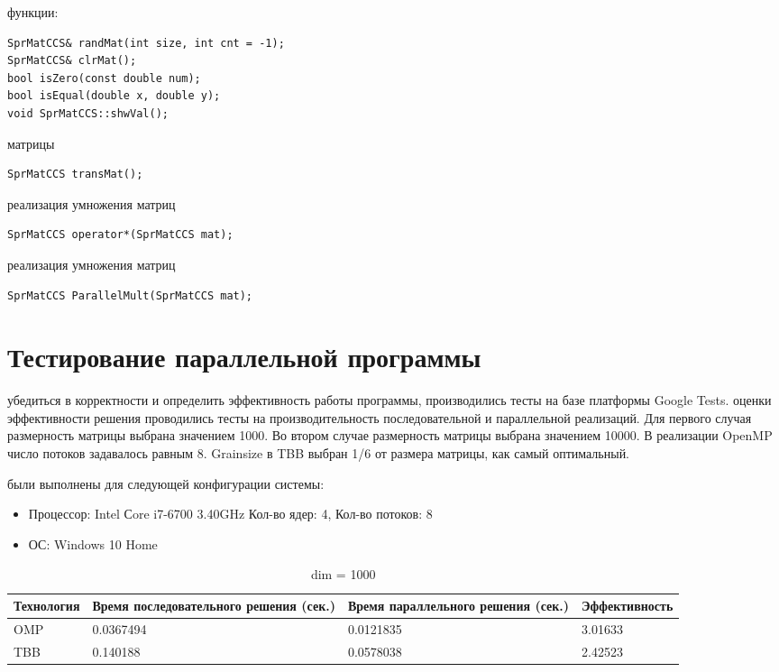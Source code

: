 \documentclass{report}
\begin{document}
 функции:
\begin{lstlisting}
SprMatCCS& randMat(int size, int cnt = -1);
SprMatCCS& clrMat();
bool isZero(const double num);
bool isEqual(double x, double y);
void SprMatCCS::shwVal();
\end{lstlisting}

 матрицы
\begin{lstlisting}
SprMatCCS transMat();
\end{lstlisting}
 реализация умножения матриц
\begin{lstlisting}
SprMatCCS operator*(SprMatCCS mat);
\end{lstlisting}
 реализация умножения матриц
\begin{lstlisting}
SprMatCCS ParallelMult(SprMatCCS mat);
\end{lstlisting}
\newpage

\section*{Тестирование параллельной программы}
 убедиться в корректности и определить эффективность работы программы, производились тесты на базе платформы Google Tests.
 оценки эффективности решения проводились тесты на производительность последовательной и параллельной реализаций. Для первого случая размерность матрицы выбрана значением 1000. Во втором случае размерность матрицы выбрана значением 10000. В реализации OpenMP число потоков задавалось равным 8. Grainsize в TBB выбран 1/6 от размера матрицы, как самый оптимальный.

 были выполнены для следующей конфигурации системы:
\begin{itemize}
    \item Процессор: Intel Сore i7-6700 3.40GHz Кол-во ядер: 4, Кол-во потоков: 8
    \item ОС: Windows 10 Home
\end{itemize}
\par
\begin{table}[!h]
    \centering
    \caption{dim = 1000}
    \vspace{1em}
    \begin{tabular}{| l | l | l | l |}
    \hline
    \scriptsize{Технология} & \scriptsize{Время последовательного решения (сек.)} & \scriptsize{Время параллельного решения (сек.)} & \scriptsize{Эффективность} \\ \hline
    OMP   &   0.0367494    &   0.0121835 &   3.01633  \\ \hline
    TBB   &   0.140188   &   0.0578038   &   2.42523  \\ \hline
    \end{tabular}
\end{table}
\end{document}
